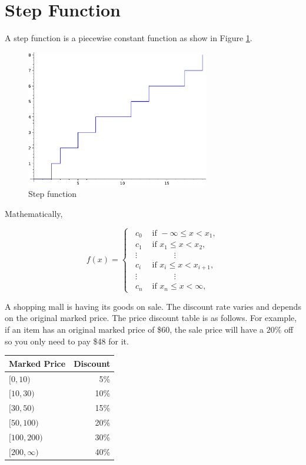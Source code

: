 \section{Step Function}

A step function is a piecewise constant function as show in Figure \ref{fig:StepFunction}.

\begin{figure}[h]
\centering
\includegraphics[width=8cm]{./figures/StepFunction.pdf}
\caption{Step function}
\label{fig:StepFunction}
\end{figure}

Mathematically,

$$
f(x) = 
\begin{cases}
\enspace c_0 & \text{ if } -\infty \le x < x_1, \\
\enspace c_1 & \text{ if } x_1 \le x < x_2, \\
\enspace \vdots & \qquad\quad\vdots \\
\enspace c_i & \text{ if } x_i \le x < x_{i+1}, \\
\enspace \vdots & \qquad\quad\vdots \\
\enspace c_n & \text{ if } x_n \le x < \infty,
\end{cases}
$$

A shopping mall is having its goods on sale. The discount rate varies and depends on the original marked price. The price discount table is as follows. For example, if an item has an original marked price of \$60, the sale price will have a $20\%$ off so you only need to pay \$48 for it.

\begin{center}
\begin{tabular}{l r } 
 \hline 
 Marked Price & Discount \\ [0.5ex] 
 \hline 
 $[0,10)$ & 5\% \\ [0.5ex] 

 $[10,30)$ & 10\% \\ [0.5ex] 

 $[30,50)$ & 15\% \\ [0.5ex]

 $[50,100)$ & 20\% \\ [0.5ex]

 $[100,200)$ & 30\% \\ [0.5ex]

 $[200,\infty)$ & 40\% \\
 \hline

\end{tabular}
\end{center}

